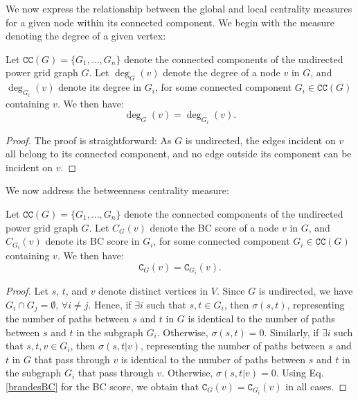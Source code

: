 We now express the relationship between the global and local centrality measures for a given node within its connected component. We begin with the measure denoting the degree of a given vertex:
\begin{proposition}
Let $\mathtt{CC}(G) = \{G_1, \ldots, G_n\}$ denote the connected components of the undirected power grid graph $G$. Let $\deg_{G}(v)$ denote the degree of a node $v$ in $G$, and $\deg_{G_i}(v)$ denote its degree in $G_i$, for some connected component $G_i \in \mathtt{CC}(G)$ containing $v$. We then have:
\begin{equation*}
\deg_{G}(v) = \deg_{G_i}(v).
\end{equation*}
\label{degs}
\end{proposition}
\begin{proof}
The proof is straightforward: As $G$ is undirected, the edges incident on $v$ all belong to its connected component, and no edge outside its component can be incident on $v$.
\end{proof}
We now address the betweenness centrality measure: 
\begin{proposition}
Let $\mathtt{CC}(G) = \{G_1, \ldots, G_n\}$ denote the connected components of the undirected power grid graph $G$. Let $C_{G}(v)$ denote the BC score of a node $v$ in $G$, and $C_{G_i}(v)$ denote its BC score in $G_i$, for some connected component $G_i \in \mathtt{CC}(G)$ containing $v$. We then have:
\begin{equation*}
\mathtt{C}_{G}(v) = \mathtt{C}_{G_i}(v).
\end{equation*}
\label{BCs}
\end{proposition}
\begin{proof}
Let $s$, $t$, and $v$ denote distinct vertices in $V$. Since $G$ is undirected, we have $G_i \cap G_j = \emptyset$, $\forall i \neq j$. Hence, if $\exists i$ such that $s, t \in G_i$, then $\sigma(s,t)$, representing the number of paths between $s$ and $t$ in $G$ is identical to the number of paths between $s$ and $t$ in the subgraph $G_i$. Otherwise, $\sigma(s,t) = 0$. Similarly, if $\exists i$ such that $s, t, v \in G_i$, then $\sigma(s,t \left \vert \right. v)$, representing the number of paths between $s$ and $t$ in $G$ that pass through $v$ is identical to the number of paths between $s$ and $t$ in the subgraph $G_i$ that pass through $v$. Otherwise, $\sigma(s,t \left \vert \right. v) = 0$. Using Eq. \ref{brandesBC} for the BC score, we obtain that $\mathtt{C}_{G}(v) = \mathtt{C}_{G_i}(v)$ in all cases.
\end{proof}


